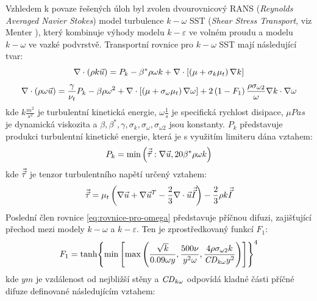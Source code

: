         Vzhledem k povaze řešených úloh byl zvolen dvourovnicový RANS (\textit{Reynolds Averaged Navier Stokes}) model turbulence $k-\omega$ SST (\textit{Shear Stress Transport}, viz Menter \cite{Menter1993,Menter1994}), který kombinuje výhody modelu $k-\varepsilon$ ve volném proudu a modelu $k-\omega$ ve vazké podvrstvě. Transportní rovnice pro $k-\omega$ SST mají následující tvar:
        \begin{equation} \label{eq:rovnice-pro-k} 
            \nabla \cdot \left( \rho k \Vec{u} \right) = P_k - \beta ^* \rho \omega k + \nabla \cdot \left[ \left( \mu + \sigma _k \mu _t \right) \nabla k \right]
        \end{equation}
        \begin{equation} \label{eq:rovnice-pro-omega}
            \nabla \cdot \left( \rho \omega \Vec{u} \right) = \frac{\gamma}{\nu _t} P_k - \beta \rho \omega ^2 + \nabla \cdot \left[ \left( \mu + \sigma _\omega \mu _t \right) \nabla \omega \right] + 2 \left( 1 - F_1 \right) \frac{\rho \sigma _{\omega 2}}{\omega} \nabla k \cdot \nabla \omega
        \end{equation}
        \noindent kde $k \unit{\frac{m^2}{s^2}}$ je turbulentní kinetická energie, $\omega \unit{\frac{1}{s}}$ je specifická rychlost disipace, $\mu \unit{Pa s}$ je dynamická viskozita a $\beta, \beta^*, \gamma, \sigma _k, \sigma _\omega, \sigma _{\omega 2}$ jsou konstanty. $P_k$ představuje produkci turbulentní kinetické energie, která je s využitím limiteru dána vztahem:
        \begin{equation}
            P_k = \min \left( \Vec{\Vec{\tau}} : \nabla \Vec{u}, 20 \beta ^* \rho \omega k \right)
        \end{equation}
        kde $\Vec{\Vec{\tau}}$ je tenzor turbulentního napětí určený vztahem:
        \begin{equation}
            \Vec{\Vec{\tau}} = \mu _t \left( \nabla \Vec{u} + \nabla \Vec{u} ^T - \frac{2}{3} \nabla \cdot \Vec{u} \Vec{\Vec{I}} \right) - \frac{2}{3} \rho k \Vec{\Vec{I}}
        \end{equation}
        Poslední člen rovnice \ref{eq:rovnice-pro-omega} představuje příčnou difuzi, zajišťující přechod mezi modely $k-\omega$ a $k-\varepsilon$. Ten je zprostředkovaný funkcí $F_1$:
        \begin{equation}
            F_1 = \tanh \Biggl\{ \min \left[  \max \left( \frac{\sqrt{k}}{0.09 \omega y}, \frac{500 \nu}{y^2 \omega}, \frac{4 \rho \sigma _{\omega 2} k}{\mathord{\mathit{CD}}_{k \omega} y^2} \right) \right] \Biggr\} ^4  
        \end{equation}
        \noindent kde $y \unit{m}$ je vzdálenost od nejbližší stěny a $\mathord{\mathit{CD}}_{k \omega}$ odpovídá kladné části příčné difuze definované následujícím vztahem:
